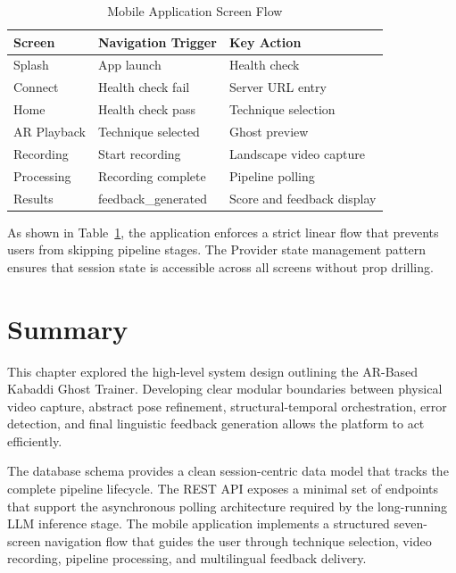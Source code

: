 \begin{sloppypar}
\begin{table}[H]
\centering
\caption{Mobile Application Screen Flow}
\label{tab:app_screens}
\begin{tabular}{|l|l|p{5cm}|}
\hline
\textbf{Screen} & \textbf{Navigation Trigger} & \textbf{Key Action} \\
\hline
Splash & App launch & Health check \\
\hline
Connect & Health check fail & Server URL entry \\
\hline
Home & Health check pass & Technique selection \\
\hline
AR Playback & Technique selected & Ghost preview \\
\hline
Recording & Start recording & Landscape video capture \\
\hline
Processing & Recording complete & Pipeline polling \\
\hline
Results & feedback\_generated & Score and feedback display \\
\hline
\end{tabular}
\end{table}

As shown in Table~\ref{tab:app_screens}, the application enforces a strict linear flow that prevents users from skipping pipeline stages. The Provider state management pattern ensures that session state is accessible across all screens without prop drilling.


\section{Summary}

This chapter explored the high-level system design outlining the AR-Based Kabaddi Ghost Trainer. Developing clear modular boundaries between physical video capture, abstract pose refinement, structural-temporal orchestration, error detection, and final linguistic feedback generation allows the platform to act efficiently.

The database schema provides a clean session-centric data model that tracks the complete pipeline lifecycle. The REST API exposes a minimal set of endpoints that support the asynchronous polling architecture required by the long-running LLM inference stage. The mobile application implements a structured seven-screen navigation flow that guides the user through technique selection, video recording, pipeline processing, and multilingual feedback delivery.

\end{sloppypar}
